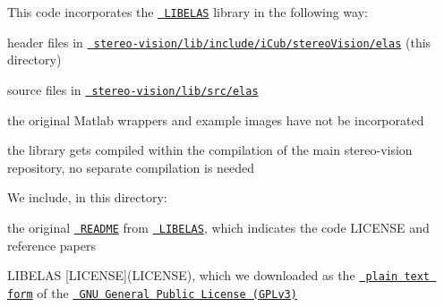 This code incorporates the \href{http://www.cvlibs.net/software/libelas/}{\texttt{ L\+I\+B\+E\+L\+AS}} library in the following way\+:
\begin{DoxyItemize}
\item header files in \href{./}{\texttt{ stereo-\/vision/lib/include/i\+Cub/stereo\+Vision/elas}} (this directory)
\item source files in \href{../../../../src/elas}{\texttt{ stereo-\/vision/lib/src/elas}}
\item the original Matlab wrappers and example images have not be incorporated
\item the library gets compiled within the compilation of the main {\ttfamily stereo-\/vision} repository, no separate compilation is needed
\end{DoxyItemize}

We include, in this directory\+:
\begin{DoxyItemize}
\item the original \href{LIBELAS-README.txt}{\texttt{ R\+E\+A\+D\+ME}} from \href{http://www.cvlibs.net/software/libelas/}{\texttt{ L\+I\+B\+E\+L\+AS}}, which indicates the code L\+I\+C\+E\+N\+SE and reference papers
\item L\+I\+B\+E\+L\+AS \mbox{[}L\+I\+C\+E\+N\+SE\mbox{]}(L\+I\+C\+E\+N\+SE), which we downloaded as the \href{http://www.gnu.org/licenses/gpl-3.0.txt}{\texttt{ plain text form}} of the \href{http://www.gnu.org/licenses/gpl.html}{\texttt{ G\+NU General Public License (G\+P\+Lv3)}} 
\end{DoxyItemize}
